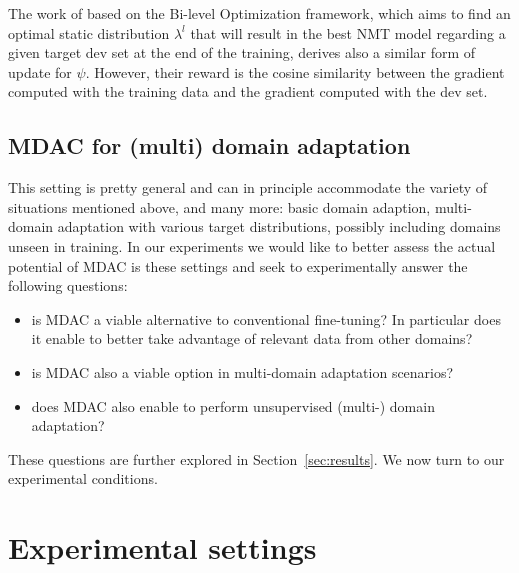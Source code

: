 \documentclass[11pt]{article}
\newcommand{\fyDone}[1]{\done[FY]\Todo[FY:]{\textcolor{orange}{#1}}}
\begin{document}
The work of \cite{Wang20balancing} based on the Bi-level Optimization framework, which aims to find an optimal static distribution $\lambda^{l}$ that will result in the best NMT model regarding a given target dev set at the end of the training, derives also a similar form of update for $\psi$. However, their reward is the cosine similarity between the gradient computed with the training data and the gradient computed with the dev set.

\subsection{MDAC for (multi) domain adaptation}
This setting is pretty general and can in principle accommodate the variety of situations mentioned  above, and many more: basic domain adaption, multi-domain adaptation with various target distributions, possibly including domains unseen in training. In our experiments we would like to better assess the actual potential of MDAC is these settings and seek to experimentally answer the following questions:
\begin{itemize}
\item is MDAC a viable alternative to conventional fine-tuning? In particular does it enable to better take advantage of relevant data from other domains?
\item is MDAC also a viable option in multi-domain adaptation scenarios?
\item does MDAC also enable to perform unsupervised (multi-) domain adaptation? \fyDone{TBContinued}
\end{itemize}

These questions are further explored in Section~\ref{sec:results}. We now turn to our experimental conditions.

\section{Experimental settings} \label{sec:exp}
\end{document}
